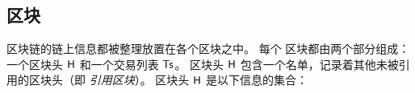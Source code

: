 \subsection{区块}
\label{sec:block}

{\name} 区块链的链上信息都被整理放置在各个区块之中。
%
每个 {\name} 区块都由两个部分组成：一个区块头 $\textsf{H}$ 和一个交易列表 $\textsf{Ts}$。
区块头 $\textsf{H}$ 包含一个名单，记录着其他未被引用的区块头（即 \emph{引用区块}）。
区块头 $\textsf{H}$ 是以下信息的集合：
